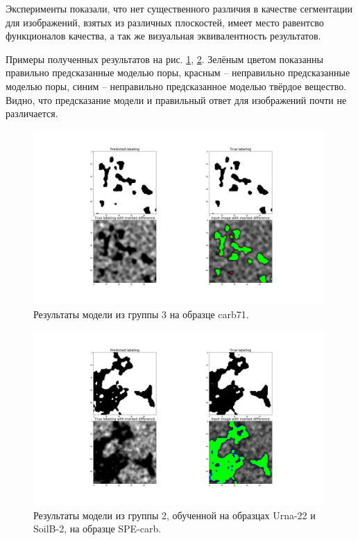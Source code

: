 \documentclass[12pt, a4paper]{extarticle}
\begin{document}
Эксперименты показали, что нет существенного различия в качестве сегментации для изображений, взятых из различных плоскостей, имеет место равентсво функционалов качества, а так же визуальная эквивалентность результатов. 

Примеры полученных результатов на рис. \ref{res_all}, \ref{res_soil_urna}. Зелёным цветом показанны правильно предсказанные моделью поры, красным -- неправильно предсказанные моделью поры, синим -- неправильно предсказанное моделью твёрдое вещество. Видно, что предсказание модели и правильный ответ для изображений почти не различается.

\begin{figure}[h!]
\includegraphics[width=0.99\textwidth]{data/images/all_carb71.png}
\caption{Результаты модели из группы 3 на образце carb71.}
\label{res_all}
\end{figure}


\begin{figure}[h!]
\includegraphics[width=0.99\textwidth]{data/images/Soil_Urna_SPE_carb10_58_box3.png}
\caption{Результаты модели из группы 2, обученной на образцах Urna-22 и SoilB-2, на образце SPE-carb.}
\label{res_soil_urna}
\end{figure}
\end{document}
